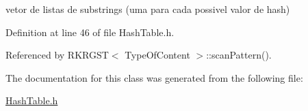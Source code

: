vetor de listas de substrings (uma para cada possivel valor de hash) 



Definition at line 46 of file Hash\+Table.\+h.



Referenced by R\+K\+R\+G\+S\+T$<$ Type\+Of\+Content $>$\+::scan\+Pattern().



The documentation for this class was generated from the following file\+:\begin{DoxyCompactItemize}
\item 
\hyperlink{HashTable_8h}{Hash\+Table.\+h}\end{DoxyCompactItemize}
